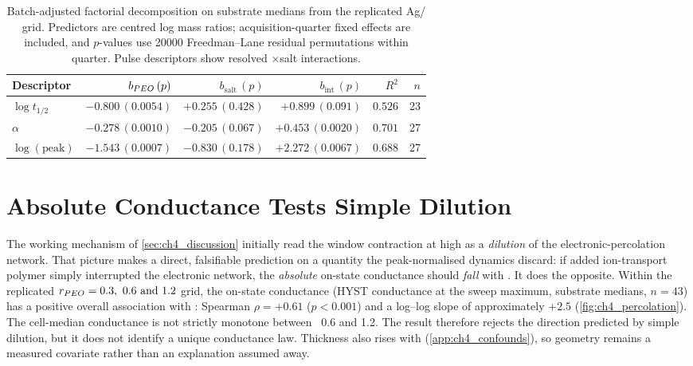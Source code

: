 \begin{table}[t]
  \centering
  \caption[Factorial decomposition of the composition axes]{Batch-adjusted factorial decomposition on substrate medians from the replicated Ag/ grid. Predictors are centred log mass ratios; acquisition-quarter fixed effects are included, and \(p\)-values use \num{20000} Freedman--Lane residual permutations within quarter. Pulse descriptors show resolved \PEO{}\(\times\)salt interactions.}
  \label{tab:ch4_factorial}
  \footnotesize
  \setlength{\tabcolsep}{5pt}
  \begin{tabular}{lrrrrr}
    \toprule
    Descriptor & \(b_{PEO{}}\,(p)\) & \(b_{\mathrm{salt}}\,(p)\) & \(b_{\mathrm{int}}\,(p)\) & \(R^2\) & \(n\) \\
    \midrule
    \(\log t_{1/2}\)      & \(-0.800\,(0.0054)\) & \(+0.255\,(0.428)\) & \(+0.899\,(0.091)\) & \(0.526\) & 23 \\
    \(\alpha\)            & \(-0.278\,(0.0010)\) & \(-0.205\,(0.067)\) & \(+0.453\,(0.0020)\) & \(0.701\) & 27 \\
    \(\log(\text{peak})\) & \(-1.543\,(0.0007)\) & \(-0.830\,(0.178)\) & \(+2.272\,(0.0067)\) & \(0.688\) & 27 \\
    \bottomrule
  \end{tabular}
\end{table}

\section{Absolute Conductance Tests Simple Dilution}\label{app:ch4_percolation}

The working mechanism of \cref{sec:ch4_discussion} initially read the window
contraction at high \PEO{} as a \emph{dilution} of the \SY{}
electronic-percolation network. That picture makes a direct, falsifiable
prediction on a quantity the peak-normalised dynamics discard: if added
ion-transport polymer simply interrupted the electronic network, the
\emph{absolute} on-state conductance should \emph{fall} with \PEO{}. It does the
opposite. Within the replicated \(r_{\PEO{}}=\numlist{0.3;0.6;1.2}\) grid, the
on-state conductance (HYST conductance at the sweep maximum, substrate medians,
\(n=43\)) has a positive overall association with \PEO{}: Spearman
\(\rho=+0.61\) (\(p<0.001\)) and a log--log slope of approximately \(+2.5\)
(\cref{fig:ch4_percolation}). The cell-median conductance is not strictly
monotone between \PEO{}~\num{0.6} and \num{1.2}. The result therefore rejects the
direction predicted by simple dilution, but it does not identify a unique
conductance law. Thickness also rises with \PEO{} (\cref{app:ch4_confounds}), so
geometry remains a measured covariate rather than an explanation assumed away.

